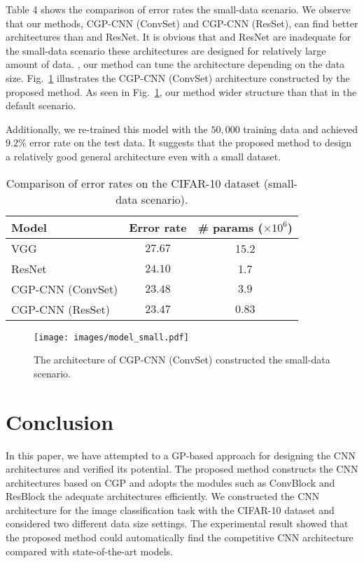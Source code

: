 Table 4 shows the comparison of error rates  the small-data scenario. We observe that our methods, CGP-CNN (ConvSet) and CGP-CNN (ResSet), can find better architectures than  and ResNet.
It is obvious that  and ResNet are inadequate for the small-data scenario  these architectures are designed for  relatively large amount of data. , our method can tune the architecture depending on the data size.
Fig.~\ref{model_small} illustrates the CGP-CNN (ConvSet) architecture constructed by  the proposed method.
As seen in Fig.~\ref{model_small}, our method  wider structure than that in the default scenario.

Additionally, we  re-trained this model with the $50,000$ training data and achieved  $9.2\%$ error rate on the test data. It suggests that the proposed method  to design a relatively good general architecture even with a small dataset.


\begin{table}[t]
  \caption{Comparison of error rates on the CIFAR-10 dataset (small-data scenario).}
  \label{results_small}
  \begin{tabular}{l|c|c} \hline
   Model & Error rate & \# params ($\times 10^6$) \\ \hline
   VGG \cite{simonyan_very_2014} & $27.67$ & 15.2 \\
   ResNet \cite{he_deep_2016} & $24.10$ & 1.7 \\ 
   CGP-CNN (ConvSet) & $23.48$  & $3.9$  \\
   CGP-CNN (ResSet) & $23.47$ & $0.83$ \\ \hline
  \end{tabular}
\end{table}

\begin{figure}[t]
\texttt{[image: images/model\_small.pdf]}
\caption{The architecture of CGP-CNN (ConvSet) constructed  the small-data scenario.}
\label{model_small}
\end{figure}


\section{Conclusion}
In this paper, we have attempted to  a GP-based approach for designing the CNN architectures and  verified its potential.
The proposed method constructs the CNN architectures based on CGP and adopts the  modules\new{,} such as ConvBlock and ResBlock\new{,}  the adequate architectures efficiently.
We  constructed the CNN architecture for the image classification task with the CIFAR-10 dataset and considered two different data size settings. The experimental result showed that the proposed method could automatically find the competitive CNN architecture compared with  state-of-the-art models.

